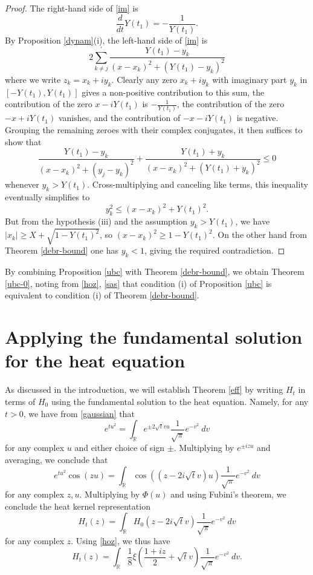 \documentclass[a4paper,11pt,twoside]{amsart}
\newcommand\R{\mathbb{R}}
\begin{document}
\begin{proof}
The right-hand side of \eqref{im} is
$$ \frac{d}{d t} Y(t_1) = -\frac{1}{Y(t_1)}.$$
By Proposition \ref{dynam}(i), the left-hand side of \eqref{im} is
$$ 2 \sum_{k \neq j}^{\prime} \frac{Y(t_1) - y_k}{(x-x_k)^2 + (Y(t_1)-y_k)^2}$$
where we write $z_k = x_k + i y_k$.  Clearly any zero $x_k+iy_k$ with imaginary part $y_k$ in $[-Y(t_1),Y(t_1)]$ gives a non-positive contribution to this sum, the contribution of the zero $x- iY(t_1)$ is $-\frac{1}{Y(t_1)}$, the contribution of the zero $-x+iY(t_1)$ vanishes, and the contribution of $-x-iY(t_1)$ is negative.  Grouping the remaining zeroes with their complex conjugates, it then suffices to show that
$$ \frac{Y(t_1) - y_k}{(x-x_k)^2 + (y_j-y_k)^2} + \frac{Y(t_1) + y_k}{(x-x_k)^2 + (Y(t_1)+y_k)^2} \leq 0$$
whenever $y_k > Y(t_1)$.  Cross-multiplying and canceling like terms, this inequality eventually simplifies to
$$ y_k^2 \leq (x-x_k)^2 + Y(t_1)^2.$$
But from the hypothesis (iii) and the assumption $y_k > Y(t_1)$, we have $|x_k| \geq X+\sqrt{1-Y(t_1)^2}$, so $(x-x_k)^2 \geq 1-Y(t_1)^2$.  On the other hand from Theorem \ref{debr-bound} one has $y_k < 1$, giving the required contradiction.
\end{proof}

By combining Proposition \ref{ubc} with Theorem \ref{debr-bound}, we obtain Theorem \ref{ubc-0}, noting from \eqref{hoz}, \eqref{sas} that condition (i) of Proposition \ref{ubc} is equivalent to condition (i) of Theorem \ref{debr-bound}.

\section{Applying the fundamental solution for the heat equation}\label{heatflow-sec}

As discussed in the introduction, we will establish Theorem \ref{eff} by writing $H_t$ in terms of $H_0$ using the fundamental solution to the heat equation.  Namely, for any $t>0$, we have from \eqref{gaussian} that
$$
e^{tu^2} = \int_\R e^{\pm 2 \sqrt{t} vu} \frac{1}{\sqrt{\pi}} e^{-v^2}\ dv$$
for any complex $u$ and either choice of sign $\pm$. Multiplying by $e^{\pm i zu}$ and averaging, we conclude that
$$
e^{tu^2} \cos(zu) = \int_\R \cos\left(\left(z - 2 i \sqrt{t} v\right)u\right) \frac{1}{\sqrt{\pi}} e^{-v^2}\ dv$$
for any complex $z,u$.  Multiplying by $\Phi(u)$ and using Fubini's theorem, we conclude the heat kernel representation
$$ H_t(z) = \int_\R H_0( z - 2i \sqrt{t} v ) \frac{1}{\sqrt{\pi}} e^{-v^2}\ dv $$
for any complex $z$.  Using \eqref{hoz}, we thus have
\begin{equation}\label{htz}
 H_t(z) = \int_\R \frac{1}{8} \xi\left( \frac{1+iz}{2} + \sqrt{t} v \right) \frac{1}{\sqrt{\pi}} e^{-v^2}\ dv.
\end{equation}
\end{document}
